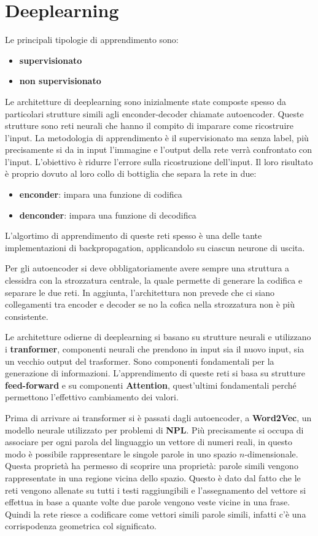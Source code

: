 \chapter{Deeplearning}
Le principali tipologie di apprendimento sono:
\begin{itemize}
    \item \textbf{supervisionato}
    \item \textbf{non supervisionato}
\end{itemize}
Le architetture di deeplearning sono inizialmente state composte spesso da particolari strutture
simili agli enconder-decoder chiamate autoencoder. Queste strutture sono reti 
neurali che hanno il compito di imparare come ricostruire l'input. La metodologia
di apprendimento è il supervisionato ma senza label, più precisamente si da in 
input l'immagine e l'output della rete verrà confrontato con l'input. L'obiettivo
è ridurre l'errore sulla ricostruzione dell'input.
Il loro risultato è proprio dovuto al loro collo di bottiglia che separa la rete
in due:
\begin{itemize}
    \item \textbf{enconder}: impara una funzione di codifica
    \item \textbf{denconder}: impara una funzione di decodifica
\end{itemize}
L'algortimo di apprendimento di queste reti spesso è una delle tante implementazioni
di backpropagation, applicandolo su ciascun neurone di uscita.

Per gli autoencoder si deve obbligatoriamente avere sempre una struttura a clessidra
con la strozzatura centrale, la quale permette di generare la codifica e separare
le due reti. In aggiunta, l'architettura non prevede che ci siano collegamenti
tra encoder e decoder se no la cofica nella strozzatura non è più consistente.

Le architetture odierne di deeplearning si basano su strutture neurali e utilizzano i 
\textbf{tranformer}, componenti neurali che prendono in input sia il nuovo input, 
sia un vecchio output del trasformer. Sono componenti fondamentali per la generazione
di informazioni. L'apprendimento di queste reti si basa su strutture \textbf{feed-forward}
e su componenti \textbf{Attention}, quest'ultimi fondamentali perché permettono
l'effettivo cambiamento dei valori. 

Prima di arrivare ai transformer si è passati dagli autoencoder, a \textbf{Word2Vec},
un modello neurale utilizzato per problemi di \textbf{NPL}. Più precisamente si occupa
di associare per ogni parola del linguaggio un vettore di numeri reali, in questo
modo è possibile rappresentare le singole parole in uno spazio $n$-dimensionale.
Questa proprietà ha permesso di scoprire una proprietà: parole simili vengono 
rappresentate in una regione vicina dello spazio. Questo è dato dal fatto che 
le reti vengono allenate su tutti i testi raggiungibili e l'assegnamento del vettore
si effettua in base a quante volte due parole vengono veste vicine in una frase. 
Quindi la rete riesce a codificare come vettori simili parole simili, infatti c'è 
una corrispodenza geometrica col significato. 

